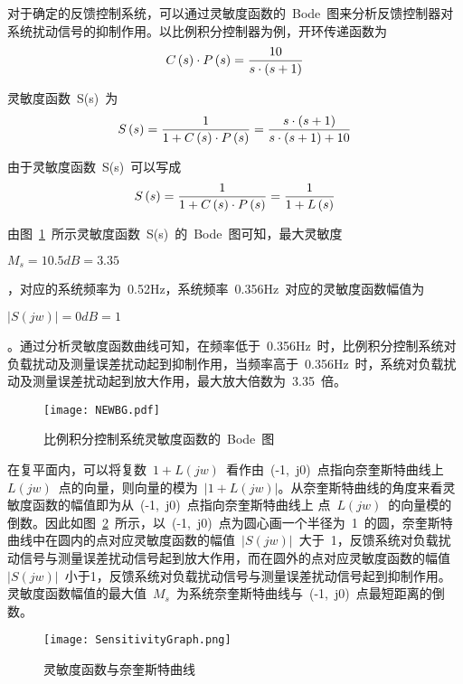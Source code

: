 对于确定的反馈控制系统，可以通过灵敏度函数的~Bode~图来分析反馈控制器对系统扰动信号的抑制作用。以比例积分控制器为例，开环传递函数为
\begin{equation}\label{equ:chap3:Index12}
  C\left(s\right)\cdot P\left(s\right)=\displaystyle\frac{10}{s\cdot \left(s+1\right)}
\end{equation}

灵敏度函数~S(s)~为
\begin{equation}\label{equ:chap3:Index13}
  S\left(s\right)=\displaystyle\frac{1}{1+C\left(s\right)\cdot P\left(s\right)}=\displaystyle\frac{s\cdot \left(s+1\right)}{s\cdot \left(s+1\right)+10}
\end{equation}

由于灵敏度函数~S(s)~可以写成
\begin{equation}\label{equ:chap3:Index14}
  S\left(s\right)=\displaystyle\frac{1}{1+C\left(s\right)\cdot P\left(s\right)}=\displaystyle\frac{1}{1+L\left(s\right)}
\end{equation}

由图~\ref{fig:chap3:Bodegraph}~所示灵敏度函数~S(s)~的~Bode~图可知，最大灵敏度~\begin{small}$M_s=10.5dB=3.35$\end{small}，对应的系统频率为~0.52Hz，系统频率~0.356Hz~对应的灵敏度函数幅值为~\begin{small}$\left\vert S\left(jw\right)\right\vert=0dB=1$\end{small}。通过分析灵敏度函数曲线可知，在频率低于~0.356Hz~时，比例积分控制系统对负载扰动及测量误差扰动起到抑制作用，当频率高于~0.356Hz~时，系统对负载扰动及测量误差扰动起到放大作用，最大放大倍数为~3.35~倍。

\begin{figure}[h]
  \centering
     \texttt{[image: NEWBG.pdf]}
   \caption{比例积分控制系统灵敏度函数的~Bode~图}\label{fig:chap3:Bodegraph}
\end{figure}

在复平面内，可以将复数~$1+L\left(jw\right)$~看作由~(-1,~j0)~点指向奈奎斯特曲线上~$L\left(jw\right)$~点的向量，则向量的模为~$\left\vert1+L\left(jw\right)\right\vert$。从奈奎斯特曲线的角度来看灵敏度函数的幅值即为从~(-1,~j0)~点指向奈奎斯特曲线上 点~$L\left(jw\right)$~的向量模的倒数。因此如图~\ref{fig:chap3:sensitivitygraph}~所示，以~(-1,~j0)~点为圆心画一个半径为~1~的圆，奈奎斯特曲线中在圆内的点对应灵敏度函数的幅值~$\left\vert S\left(jw\right)\right\vert$~大于~1，反馈系统对负载扰动信号与测量误差扰动信号起到放大作用，而在圆外的点对应灵敏度函数的幅值~$\left\vert S\left(jw\right)\right\vert$~小于1，反馈系统对负载扰动信号与测量误差扰动信号起到抑制作用。灵敏度函数幅值的最大值~$M_s$~为系统奈奎斯特曲线与~(-1,~j0)~点最短距离的倒数。
\begin{figure}[h]
  \centering
     \texttt{[image: SensitivityGraph.png]}\\
   \caption{灵敏度函数与奈奎斯特曲线}\label{fig:chap3:sensitivitygraph}
\end{figure}


